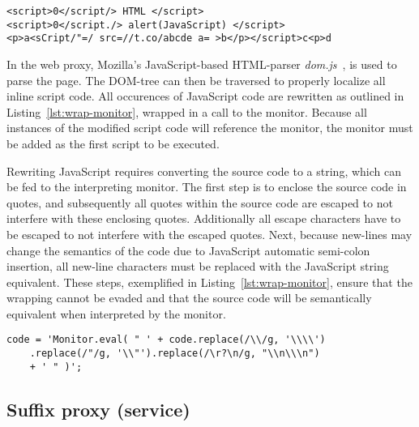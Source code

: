 \documentclass{llncs}
\begin{document}
\begin{lstlisting}[language=langsmall,label=lst:crazy-html, caption=Example of complicated HTML]
<script>0</script/> HTML </script>
<script>0</script./> alert(JavaScript) </script>
<p>a<sCript/"=/ src=//t.co/abcde a= >b</p></script>c<p>d
\end{lstlisting}


In the web proxy, Mozilla's JavaScript-based HTML-parser \emph{dom.js}~\cite{Mozilla:dom.js}, is used 
to parse the page. The DOM-tree can then be traversed to properly localize 
all inline script code. All occurences of JavaScript code are rewritten as 
outlined in Listing~\ref{lst:wrap-monitor}, wrapped in a call to the monitor.
Because all instances of the modified script code will reference the monitor, 
the monitor must be added as the first script to be executed.


Rewriting JavaScript requires converting the source code to a string, which can 
be fed to the interpreting monitor. The first step is to enclose the source code 
in quotes, and subsequently all quotes within the source code are escaped to 
not interfere with these enclosing quotes.
Additionally all escape characters have to be escaped to not interfere with the escaped 
quotes. Next, because new-lines may change the semantics of the code due to 
JavaScript automatic semi-colon insertion, all new-line 
characters must be replaced with the JavaScript string equivalent.
These steps, exemplified in Listing~\ref{lst:wrap-monitor}, ensure that the 
wrapping cannot be evaded and that the source code 
will be semantically equivalent when interpreted by the monitor.

\begin{lstlisting}[language=langsmall,label=lst:wrap-monitor, caption=Example of monitor wrapping]
code = 'Monitor.eval( " ' + code.replace(/\\/g, '\\\\')
	.replace(/"/g, '\\"').replace(/\r?\n/g, "\\n\\\n")
	+ ' " )';
\end{lstlisting}




\subsection{Suffix proxy (service)}
\end{document}

